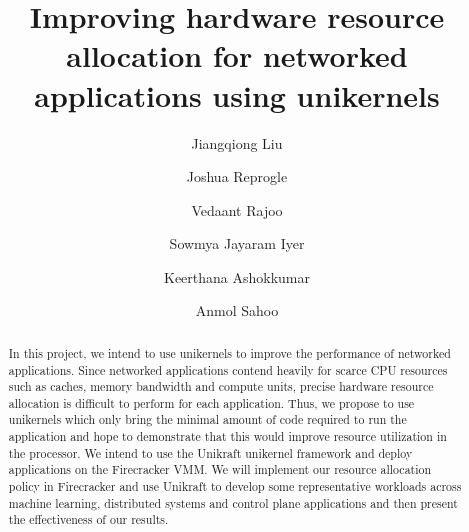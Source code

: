 \documentclass[sigconf]{acmart}
\begin{document}
\title{Improving hardware resource allocation for networked applications using
unikernels}

\author{Jiangqiong Liu}

\author{Joshua Reprogle}

\author{Vedaant Rajoo}

\author{Sowmya Jayaram Iyer}

\author{Keerthana Ashokkumar}

\author{Anmol Sahoo}

\renewcommand{\shortauthors}{Liu et al.}

\begin{abstract}
In this project, we intend to use unikernels to improve the performance of
networked applications. Since networked applications contend heavily for
scarce CPU resources such as caches, memory bandwidth and compute units,
precise hardware resource allocation is difficult to perform for each
application. Thus, we propose to use unikernels which only bring the minimal
amount of code required to run the application and hope to demonstrate that
this would improve resource utilization in the processor. We intend to use
the Unikraft unikernel framework and deploy applications on the Firecracker
VMM. We will implement our resource allocation policy in Firecracker and use
Unikraft to develop some representative workloads across machine learning,
distributed systems and control plane applications and then present the
effectiveness of our results.
\end{abstract}
\end{document}
